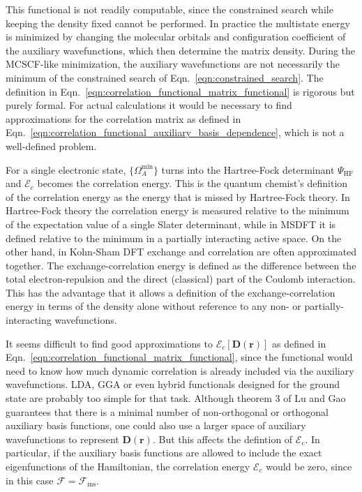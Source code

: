 \documentclass[journal=jacsat,manuscript=article]{achemso}
\newcommand\m[1]{\mathbf{#1}}
\renewcommand\vec[1]{\mathbf{#1}}
\begin{document}
This functional is not readily computable, since the constrained search while keeping the density fixed cannot be performed.
In practice the multistate energy is minimized by changing the molecular orbitals and configuration coefficient of the auxiliary
wavefunctions, which then determine the matrix density. During the MCSCF-like minimization,
the auxiliary wavefunctions are not necessarily the minimum of the constrained
search of Eqn.~\ref{eqn:constrained_search}. The definition in Eqn.~\ref{eqn:correlation_functional_matrix_functional}
is rigorous but purely formal. For actual calculations it would be necessary to find approximations for the correlation matrix
as defined in Eqn.~\ref{eqn:correlation_functional_auxiliary_basis_dependence}, which is not a well-defined problem.

For a single electronic state, $\{\Omega_A^{\text{min}}\}$ turns into the Hartree-Fock determinant $\Psi_{\text{HF}}$ and $\mathcal{E}_c$
becomes the correlation energy. This is the quantum chemist's definition of the correlation energy as the energy that is missed by
Hartree-Fock theory. \cite[2.2.7]{Szabo_Ostlund_book}
In Hartree-Fock theory the correlation energy is measured relative to the minimum of the
expectation value of a single Slater determinant, while in MSDFT it is defined relative
to the minimum in a partially interacting active space. \cite{Lu2022JPCL}
On the other hand, in Kohn-Sham DFT exchange and correlation
are often approximated together. The exchange-correlation energy is defined as the difference between the total electron-repulsion
and the direct (classical) part of the Coulomb interaction. \cite{Lieb1979}
This has the advantage that it allows a definition of the exchange-correlation energy in terms of the density alone
without reference to any non- or partially-interacting wavefunctions.

It seems difficult to find good approximations to $\m{\mathcal{E}}_c[\m{D}(\vec{r})]$ as defined in Eqn.~\ref{eqn:correlation_functional_matrix_functional},
since the functional would need to know how much dynamic correlation is already included via
the auxiliary wavefunctions. LDA, GGA or even hybrid functionals designed for the ground state are probably too simple for that task.
Although theorem 3 of Lu and Gao \cite{Lu2022JPCL} guarantees that there is a minimal number of non-orthogonal \cite{Lu2022JPCL}
or orthogonal \cite{Lu2022fundamental} auxiliary basis functions, one could also use a larger space of auxiliary wavefunctions to
represent $\m{D}(\vec{r})$. But this affects the defintion of $\mathcal{E}_{c}$. In particular, if the auxiliary basis functions are
allowed to include the exact eigenfunctions of the Hamiltonian, the correlation energy $\m{\mathcal{E}}_c$ would be zero, since in this case
$\m{\mathcal{F}} = \m{\mathcal{F}}_{\text{ms}}$.
\end{document}
